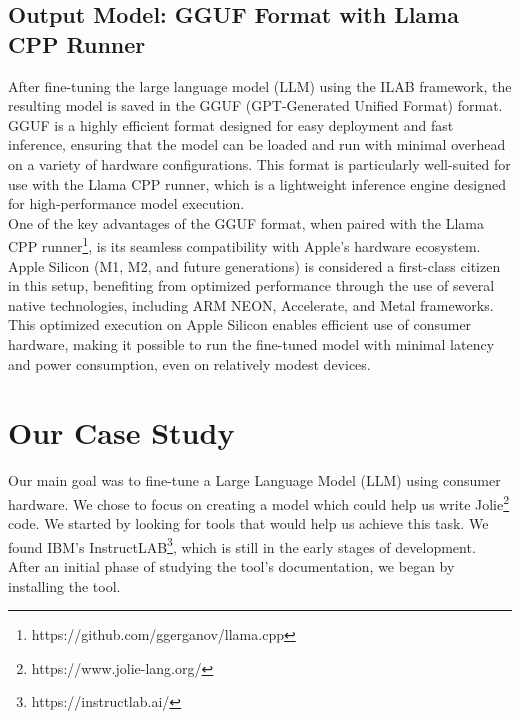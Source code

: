 \documentclass[12pt]{article}
\begin{document}
\subsection{Output Model: GGUF Format with Llama CPP Runner}\label{gguf}
After fine-tuning the large language model (LLM) using the ILAB framework, the resulting model is saved in the GGUF (GPT-Generated Unified Format) format.\\
GGUF is a highly efficient format designed for easy deployment and fast inference, ensuring that the model can be loaded and run with minimal overhead on a variety of hardware configurations. This format is particularly well-suited for use with the Llama CPP runner, which is a lightweight inference engine designed for high-performance model execution.\\
One of the key advantages of the GGUF format, when paired with the Llama CPP runner\footnote{https://github.com/ggerganov/llama.cpp}, is its seamless compatibility with Apple's hardware ecosystem. Apple Silicon (M1, M2, and future generations) is considered a first-class citizen in this setup, benefiting from optimized performance through the use of several native technologies, including ARM NEON, Accelerate, and Metal frameworks.\\
This optimized execution on Apple Silicon enables efficient use of consumer hardware, making it possible to run the fine-tuned model with minimal latency and power consumption, even on relatively modest devices.

\pagebreak

\section{Our Case Study}
Our main goal was to fine-tune a Large Language Model (LLM) using consumer hardware. We chose to focus on creating a model which could help us write Jolie\footnote{https://www.jolie-lang.org/} code. We started by looking for tools that would help us achieve this task. We found IBM's InstructLAB\footnote{https://instructlab.ai/}, which is still in the early stages of development.\vspace{14pt}\\
After an initial phase of studying the tool's documentation, we began by installing the tool.
\end{document}
